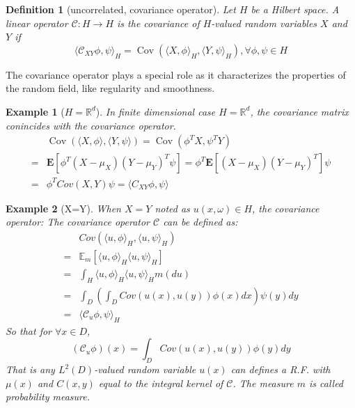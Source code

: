 \documentclass{article}
\newtheorem{definition}{Definition}
\newtheorem{example}{Example}
\begin{document}
\begin{definition}[uncorrelated, covariance operator]
  Let $H$ be a Hilbert space. A linear operator $\mathcal{C}:H\rightarrow H$ is the covariance of $H$-valued random variables $X$ and $Y$ if 
  \begin{equation}
      \langle\mathcal{C}_{XY}\phi, \psi\rangle_H = \operatorname{Cov}\left(\langle X, \phi\rangle_H, \langle Y, \psi\rangle_H\right), \forall \phi, \psi \in H
  \end{equation}
\end{definition}
The covariance operator plays a special role as it characterizes the properties of the random field, like regularity and smoothness.

\begin{example}[$H = \mathbb{R}^d$]
  In finite dimensional case $H = \mathbb{R}^d$, the covariance matrix conincides with the covariance operator. 
  \begin{equation}
      \begin{aligned}
          &\operatorname{Cov}\left(\langle X, \phi\rangle, \langle Y, \psi\rangle\right) 
          = \operatorname{Cov}\left(\phi^T X, \psi^T Y\right)\\
          =&\mathbf{E}\left[\phi^T(X-\mu_X)(Y-\mu_Y)^T\psi\right] 
          = \phi^T\mathbf{E}\left[(X-\mu_X)(Y-\mu_Y)^T\right]\psi\\
          =&\phi^T Cov(X, Y)\psi = \langle C_{XY}\phi, \psi\rangle
      \end{aligned}
  \end{equation}
\end{example}

\begin{example}[X=Y]
  When $X = Y$ noted as $u(x, \omega)\in H$, the covariance operator:
  The covariance operator $\mathcal{C}$ can be defined as:
  \begin{equation}
    \begin{aligned}
      &Cov\left(\langle u, \phi\rangle_{H}, \langle u, \psi\rangle_{H}\right)\\
      =&\mathbb{E}_m\left[\langle u, \phi\rangle_{H}\langle u, \psi\rangle_{H}\right]\\
      =& \int_{H}\langle u, \phi\rangle_{H}\langle u, \psi\rangle_{H} m(du)\\
      =&\int_D\left(\int_D Cov(u(x), u(y)) \phi(x) dx \right) \psi(y) dy\\
      =& \langle\mathcal{C}_u\phi, \psi\rangle_{H} 
    \end{aligned}
   \end{equation}
  So that for $\forall x\in D$,
  \begin{equation}
  (\mathcal{C}_u\phi)(x) = \int_D Cov(u(x), u(y)) \phi(y) dy
  \end{equation}
  That is any $L^2(D)$-valued random variable $u(x)$ can defines a R.F. with $\mu(x)$ and $C(x, y)$ equal to the integral kernel of $\mathcal{C}$.
  The measure $m$ is called probability measure.
\end{example}
\end{document}
